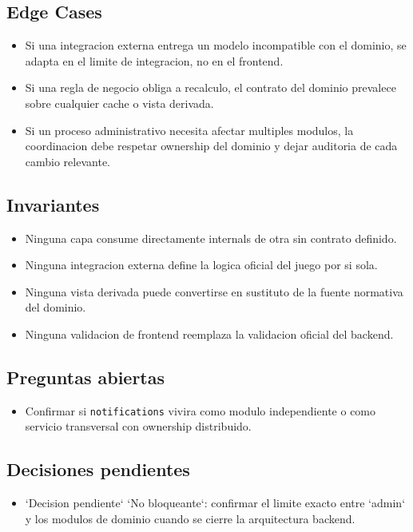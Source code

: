 \subsection{Edge Cases}

\begin{itemize}
  \item Si una integracion externa entrega un modelo incompatible con el dominio, se adapta en el limite de integracion, no en el frontend.
  \item Si una regla de negocio obliga a recalculo, el contrato del dominio prevalece sobre cualquier cache o vista derivada.
  \item Si un proceso administrativo necesita afectar multiples modulos, la coordinacion debe respetar ownership del dominio y dejar auditoria de cada cambio relevante.
\end{itemize}

\subsection{Invariantes}

\begin{itemize}
  \item Ninguna capa consume directamente internals de otra sin contrato definido.
  \item Ninguna integracion externa define la logica oficial del juego por si sola.
  \item Ninguna vista derivada puede convertirse en sustituto de la fuente normativa del dominio.
  \item Ninguna validacion de frontend reemplaza la validacion oficial del backend.
\end{itemize}

\subsection{Preguntas abiertas}

\begin{itemize}
  \item Confirmar si \texttt{notifications} vivira como modulo independiente o como servicio transversal con ownership distribuido.
\end{itemize}

\subsection{Decisiones pendientes}

\begin{itemize}
  \item `Decision pendiente` `No bloqueante`: confirmar el limite exacto entre `admin` y los modulos de dominio cuando se cierre la arquitectura backend.
\end{itemize}
